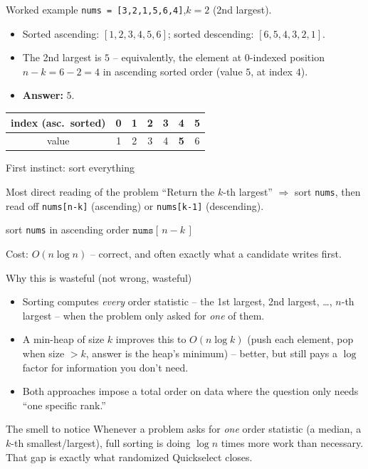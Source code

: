 \documentclass[11pt,aspectratio=169]{beamer}
\begin{document}
\begin{frame}{Worked example}
  \small
  \texttt{nums = [3,2,1,5,6,4]},\quad $k=2$ (2nd largest).
  \begin{itemize}
    \item Sorted ascending: $[1,2,3,4,5,6]$; sorted descending: $[6,5,4,3,2,1]$.
    \item The 2nd largest is $5$ -- equivalently, the element at $0$-indexed position
    $n-k = 6-2 = 4$ in ascending sorted order (value $5$, at index $4$).
    \item \textbf{Answer:} $5$.
  \end{itemize}
  \begin{center}
  \begin{tabular}{@{}c|cccccc@{}}
    index (asc.\ sorted) & 0 & 1 & 2 & 3 & \textbf{4} & 5 \\
    \midrule
    value & 1 & 2 & 3 & 4 & \textbf{5} & 6 \\
  \end{tabular}
  \end{center}
\end{frame}

\begin{frame}{First instinct: sort everything}
  \begin{block}{Most direct reading of the problem}
    ``Return the $k$-th largest'' $\Rightarrow$ sort \texttt{nums}, then read off
    \texttt{nums[n-k]} (ascending) or \texttt{nums[k-1]} (descending).
  \end{block}
  \begin{algorithmic}[1]
      \State sort \texttt{nums} in ascending order
      \State \Return $\texttt{nums}[\,n-k\,]$
    \EndFunction
  \end{algorithmic}
  Cost: $O(n\log n)$ -- correct, and often exactly what a candidate writes first.
\end{frame}

\begin{frame}{Why this is wasteful (not wrong, wasteful)}
  \begin{itemize}
    \item Sorting computes \emph{every} order statistic -- the 1st largest, 2nd
    largest, \dots, $n$-th largest -- when the problem only asked for \emph{one} of
    them.
    \item A min-heap of size $k$ improves this to $O(n\log k)$ (push each element,
    pop when size $>k$, answer is the heap's minimum) -- better, but still pays a
    $\log$ factor for information you don't need.
    \item Both approaches impose a total order on data where the question only needs
    ``one specific rank.''
  \end{itemize}
  \begin{alertblock}{The smell to notice}
    Whenever a problem asks for \emph{one} order statistic (a median, a $k$-th
    smallest/largest), full sorting is doing $\log n$ times more work than necessary.
    That gap is exactly what randomized Quickselect closes.
  \end{alertblock}
\end{frame}
\end{document}
